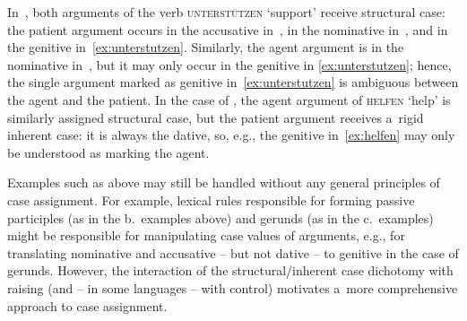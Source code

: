 \documentclass[output=paper]{langsci/langscibook}
\begin{document}
In~, both arguments of the verb \textsc{unterst\"utzen} ‘support’ receive structural case: the patient argument occurs in the accusative in~, in the nominative in~, and in the genitive in~\cref{ex:unterstutzen}.  Similarly, the agent argument is in the nominative in~, but it may only occur in the genitive in \cref{ex:unterstutzen}; hence, the single argument marked as genitive in~\cref{ex:unterstutzen} is ambiguous between the agent and the patient.  In the case of , the agent argument of \textsc{helfen} ‘help’ is similarly assigned structural case, but the patient argument receives a~rigid inherent case: it is always the dative, so, e.g., the genitive in~\cref{ex:helfen} may only be understood as marking the agent.

Examples such as above may still be handled without any general principles of case assignment.  For example, lexical rules responsible for forming passive participles (as in the b.~examples above) and gerunds (as in the c.~examples) might be responsible for manipulating case values of arguments, e.g., for translating nominative and accusative – but not dative – to genitive in the case of gerunds.  However, the interaction of the structural/inherent case dichotomy with raising (and – in some languages – with control) motivates a~more comprehensive approach to case assignment.
\end{document}
